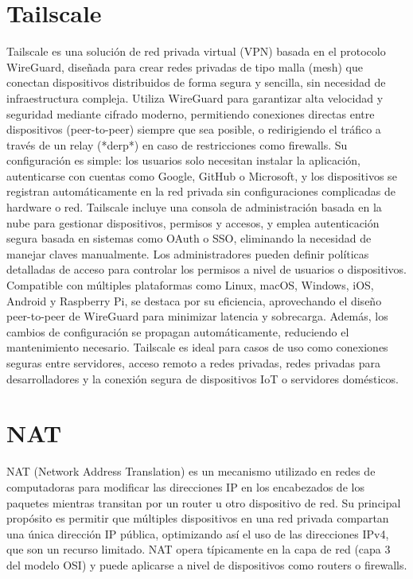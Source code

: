 \section{Tailscale}  
Tailscale es una solución de red privada virtual (VPN) basada en el protocolo WireGuard, diseñada para crear redes privadas de tipo malla (mesh) que conectan dispositivos distribuidos de forma segura y sencilla, sin necesidad de infraestructura compleja. Utiliza WireGuard para garantizar alta velocidad y seguridad mediante cifrado moderno, permitiendo conexiones directas entre dispositivos (peer-to-peer) siempre que sea posible, o redirigiendo el tráfico a través de un relay (*derp*) en caso de restricciones como firewalls. Su configuración es simple: los usuarios solo necesitan instalar la aplicación, autenticarse con cuentas como Google, GitHub o Microsoft, y los dispositivos se registran automáticamente en la red privada sin configuraciones complicadas de hardware o red. Tailscale incluye una consola de administración basada en la nube para gestionar dispositivos, permisos y accesos, y emplea autenticación segura basada en sistemas como OAuth o SSO, eliminando la necesidad de manejar claves manualmente. Los administradores pueden definir políticas detalladas de acceso para controlar los permisos a nivel de usuarios o dispositivos. Compatible con múltiples plataformas como Linux, macOS, Windows, iOS, Android y Raspberry Pi, se destaca por su eficiencia, aprovechando el diseño peer-to-peer de WireGuard para minimizar latencia y sobrecarga. Además, los cambios de configuración se propagan automáticamente, reduciendo el mantenimiento necesario. Tailscale es ideal para casos de uso como conexiones seguras entre servidores, acceso remoto a redes privadas, redes privadas para desarrolladores y la conexión segura de dispositivos IoT o servidores domésticos.

\section{NAT}
NAT (Network Address Translation) es un mecanismo utilizado en redes de computadoras para modificar las direcciones IP en los encabezados de los paquetes mientras transitan por un router u otro dispositivo de red. Su principal propósito es permitir que múltiples dispositivos en una red privada compartan una única dirección IP pública, optimizando así el uso de las direcciones IPv4, que son un recurso limitado. NAT opera típicamente en la capa de red (capa 3 del modelo OSI) y puede aplicarse a nivel de dispositivos como routers o firewalls.

